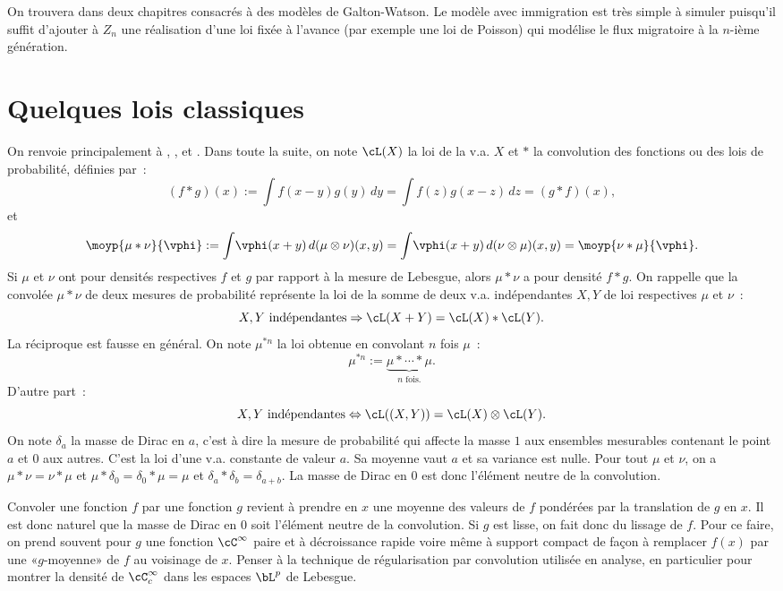 On trouvera dans \cite{ruget} deux chapitres consacrés à des modèles
de Galton-Watson. Le modèle avec immigration est très simple à simuler
puisqu'il suffit d'ajouter à $Z_n$ une réalisation d'une loi fixée à
l'avance (par exemple une loi de Poisson) qui modélise le flux
migratoire à la $n$-ième génération.

%
%
\chapter{Quelques lois classiques}
%
%

On renvoie principalement à \cite{borkar}, \cite{rudin}, \cite{bouleau} et
\cite{dacunha-castelle-duflo}. Dans toute la suite, on note $\cL(X)$ la loi de
la v.a. $X$ et $*$ la convolution des fonctions ou des lois de probabilité,
définies par~:
$$
(f*g)(x):=\int\!f(x-y)g(y)\,dy=\int\!f(z)g(x-z)\,dz=(g*f)(x),
$$
et
$$
\moyp{\mu*\nu}{\vphi} :=\int\!\vphi(x+y)\,d(\mu\otimes\nu)(x,y)
=\int\!\vphi(x+y)\,d(\nu\otimes\mu)(x,y)=\moyp{\nu*\mu}{\vphi}.
$$
Si $\mu$ et $\nu$ ont pour densités respectives $f$ et $g$ par rapport à la
mesure de Lebesgue, alors $\mu*\nu$ a pour densité $f*g$. On rappelle que la
convolée $\mu*\nu$ de deux mesures de probabilité représente la loi de la
somme de deux v.a. indépendantes $X,Y$ de loi respectives $\mu$ et $\nu$~:
$$
X,Y \text{ indépendantes} \Rightarrow \cL(X+Y)=\cL(X) * \cL(Y).
$$
La réciproque est fausse en général. On note $\mu^{*n}$ la loi obtenue en
convolant $n$ fois $\mu$~:
$$
\mu^{*n}:=\underbrace{\mu* \cdots * \mu}_{n \text{ fois.}}.
$$
D'autre part~:
$$
X,Y \text{ indépendantes} \Leftrightarrow \cL((X,Y))=\cL(X)\otimes\cL(Y).
$$
On note $\delta_a$ la masse de Dirac en $a$, c'est à dire la mesure de
probabilité qui affecte la masse $1$ aux ensembles mesurables contenant le
point $a$ et $0$ aux autres. C'est la loi d'une v.a. constante de valeur $a$.
Sa moyenne vaut $a$ et sa variance est nulle. Pour tout $\mu$ et $\nu$, on a
$\mu*\nu=\nu*\mu$ et $\mu*\delta_0=\delta_0*\mu=\mu$ et $\delta_a*\delta_b=\delta_{a+b}$. La
masse de Dirac en $0$ est donc l'élément neutre de la convolution.

\begin{eur}[Convolution = lissage]
  Convoler une fonction $f$ par une fonction $g$ revient à prendre en $x$ une
  moyenne des valeurs de $f$ pondérées par la translation de $g$ en $x$. Il
  est donc naturel que la masse de Dirac en $0$ soit l'élément neutre de la
  convolution. Si $g$ est lisse, on fait donc du lissage de $f$. Pour ce
  faire, on prend souvent pour $g$ une fonction $\cC^\infty$ paire et à
  décroissance rapide voire même à support compact de façon à remplacer $f(x)$
  par une «$g$-moyenne» de $f$ au voisinage de $x$.  Penser à la technique de
  régularisation par convolution utilisée en analyse, en particulier pour
  montrer la densité de $\cC^\infty_c$ dans les espaces $\bL^p$ de Lebesgue.
\end{eur}

